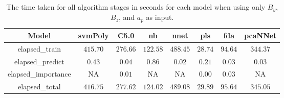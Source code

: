 \begin{table}[!ht]
	\centering
	\begin{tabular}{|c|c|c|c|c|c|c|c|}
		\hline
		Model & svmPoly & C5.0 & nb & nnet & pls & fda & pcaNNet \\ \hline
		elapsed_train & $415.70$ & $276.66$ & $122.58$ & $488.45$ & $28.74$ & $94.64$ & $344.37$ \\ \hline
		elapsed_predict & $0.43$ & $0.04$ & $0.86$ & $0.02$ & $0.21$ & $0.03$ & $0.03$ \\ \hline
		elapsed_importance & NA & $0.01$ & NA & NA & $0.00$ & $0.03$ & NA \\ \hline
		elapsed_total & $416.75$ & $277.62$ & $124.02$ & $489.08$ & $29.89$ & $95.64$ & $345.05$ \\ \hline
	\end{tabular}
	\caption{The time taken for all algorithm stages in seconds for each model when using only $B_{y}$, $B_{z}$, and $a_{p}$ as input.}
	\label{tab:time:reverse:yzap}
\end{table}

